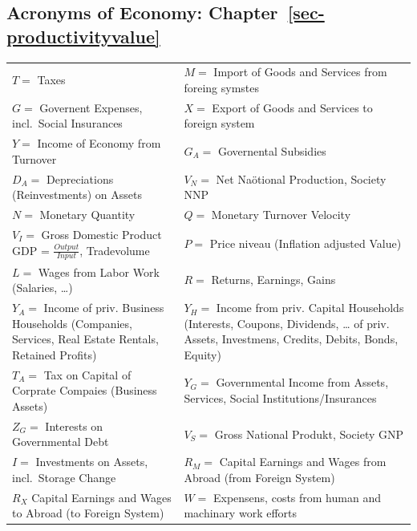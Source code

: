 \documentclass[
  letterpaper,
  DIV=11,
  numbers=noendperiod]{scrartcl}
\begin{document}
\subsection{\texorpdfstring{Acronyms of Economy:
Chapter~\ref{sec-productivityvalue}}{Acronyms of Economy: Chapter~}}\label{sec-acroeconom}

\begin{longtable}[]{@{}
  >{\raggedright\arraybackslash}p{}
  >{\raggedright\arraybackslash}p{}@{}}
\toprule\noalign{}
\endhead
\bottomrule\noalign{}
\endlastfoot
\(T =\) Taxes & \(M =\) Import of Goods and Services from foreing
symstes \\
\(G =\) Governent Expenses, incl.~Social Insurances & \(X =\) Export of
Goods and Services to foreign system \\
\(Y =\) Income of Economy from Turnover & \(G_A =\) Governental
Subsidies \\
\(D_A =\) Depreciations (Reinvestments) on Assets & \(V_N =\) Net
Naötional Production, Society NNP \\
\(N =\) Monetary Quantity & \(Q =\) Monetary Turnover Velocity \\
\(V_I =\) Gross Domestic Product GDP = \(\frac{Output}{Input}\),
Tradevolume & \(P =\) Price niveau (Inflation adjusted Value) \\
\(L =\) Wages from Labor Work (Salaries, \ldots) & \(R =\) Returns,
Earnings, Gains \\
\(Y_A =\) Income of priv. Business Households (Companies, Services, Real
Estate Rentals, Retained Profits) & \(Y_H =\) Income from priv. Capital
Households (Interests, Coupons, Dividends, \ldots{} of priv. Assets,
Investmens, Credits, Debits, Bonds, Equity) \\
\(T_A=\) Tax on Capital of Corprate Compaies (Business Assets) &
\(Y_G =\) Governmental Income from Assets, Services, Social
Institutions/Insurances \\
\(Z_G =\) Interests on Governmental Debt & \(V_S =\) Gross National
Produkt, Society GNP \\
\(I =\) Investments on Assets, incl.~Storage Change & \(R_M =\) Capital
Earnings and Wages from Abroad (from Foreign System) \\
\(R_X\) Capital Earnings and Wages to Abroad (to Foreign System) &
\(W =\) Expensens, costs from human and machinary work efforts \\
\end{longtable}
\end{document}
